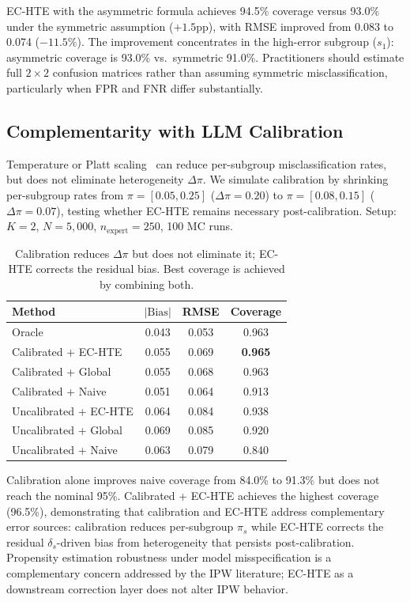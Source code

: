 EC-HTE with the asymmetric formula achieves 94.5\% coverage versus 93.0\% under the symmetric assumption ($+1.5$pp), with RMSE improved from 0.083 to 0.074 ($-11.5\%$).
The improvement concentrates in the high-error subgroup ($s_1$): asymmetric coverage is 93.0\% vs.\ symmetric 91.0\%.
Practitioners should estimate full $2 \times 2$ confusion matrices rather than assuming symmetric misclassification, particularly when FPR and FNR differ substantially.

\subsection{Complementarity with LLM Calibration}
\label{app:calibration}

Temperature or Platt scaling~\cite{guo2017calibration} can reduce per-subgroup misclassification rates, but does not eliminate heterogeneity $\Delta\pi$.
We simulate calibration by shrinking per-subgroup rates from $\pi{=}[0.05, 0.25]$ ($\Delta\pi{=}0.20$) to $\pi{=}[0.08, 0.15]$ ($\Delta\pi{=}0.07$), testing whether EC-HTE remains necessary post-calibration.
Setup: $K{=}2$, $N{=}5{,}000$, $n_{\text{expert}}{=}250$, 100 MC runs.

\begin{table}[h]
\centering
\caption{Calibration reduces $\Delta\pi$ but does not eliminate it; EC-HTE corrects the residual bias. Best coverage is achieved by combining both.}
\label{tab:calibration}
\small
\begin{tabular}{lccc}
\toprule
Method & $|\text{Bias}|$ & RMSE & Coverage \\
\midrule
Oracle                    & 0.043 & 0.053 & 0.963 \\
Calibrated + EC-HTE       & 0.055 & 0.069 & \textbf{0.965} \\
Calibrated + Global       & 0.055 & 0.068 & 0.963 \\
Calibrated + Naive        & 0.051 & 0.064 & 0.913 \\
Uncalibrated + EC-HTE     & 0.064 & 0.084 & 0.938 \\
Uncalibrated + Global     & 0.069 & 0.085 & 0.920 \\
Uncalibrated + Naive      & 0.063 & 0.079 & 0.840 \\
\bottomrule
\end{tabular}
\end{table}

Calibration alone improves naive coverage from 84.0\% to 91.3\% but does not reach the nominal 95\%.
Calibrated + EC-HTE achieves the highest coverage (96.5\%), demonstrating that calibration and EC-HTE address complementary error sources: calibration reduces per-subgroup $\pi_s$ while EC-HTE corrects the residual $\delta_s$-driven bias from heterogeneity that persists post-calibration.
Propensity estimation robustness under model misspecification is a complementary concern addressed by the IPW literature; EC-HTE as a downstream correction layer does not alter IPW behavior.

